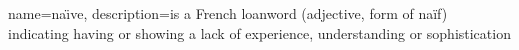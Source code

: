 {
  name=na\"{\i}ve,
  description={is a French loanword (adjective, form of naïf)
               indicating having or showing a lack of experience,
               understanding or sophistication}
}